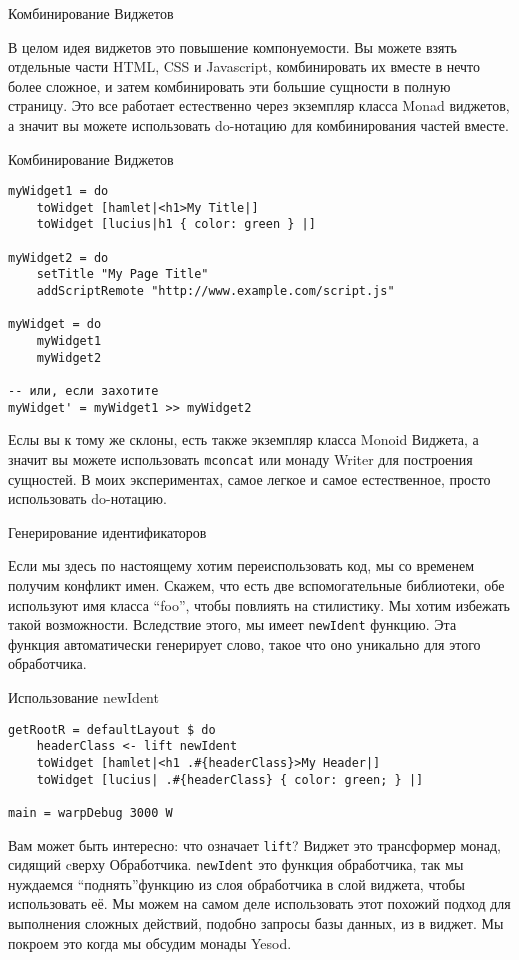 Комбинирование Виджетов

В целом идея виджетов это повышение компонуемости. Вы можете взять  отдельные части HTML, CSS и Javascript, комбинировать их вместе в нечто более сложное, и затем комбинировать эти большие сущности в полную страницу. Это все работает естественно через экземпляр класса Monad виджетов, а значит вы можете использовать do-нотацию для комбинирования частей вместе.

Комбинирование Виджетов

\begin{lstlisting}
myWidget1 = do
    toWidget [hamlet|<h1>My Title|]
    toWidget [lucius|h1 { color: green } |]

myWidget2 = do
    setTitle "My Page Title"
    addScriptRemote "http://www.example.com/script.js"

myWidget = do
    myWidget1
    myWidget2

-- или, если захотите
myWidget' = myWidget1 >> myWidget2
\end{lstlisting}

Еслы вы к тому же склоны, есть также экземпляр класса Monoid Виджета, а значит вы можете использовать \lstinline'mconcat' или монаду Writer для построения сущностей. В моих экспериментах, самое легкое и самое естественное, просто использовать do-нотацию.

Генерирование идентификаторов

Если мы здесь по настоящему хотим переиспользовать код, мы со временем получим конфликт имен. Скажем, что есть две вспомогательные библиотеки, обе используют имя класса \textquotedblleft foo\textquotedblright, чтобы повлиять на стилистику. Мы хотим избежать такой возможности. Вследствие этого, мы имеет \lstinline'newIdent' функцию.  Эта функция автоматически генерирует слово, такое что оно уникально для этого обработчика.

Использование newIdent

\begin{lstlisting}
getRootR = defaultLayout $ do
    headerClass <- lift newIdent
    toWidget [hamlet|<h1 .#{headerClass}>My Header|]
    toWidget [lucius| .#{headerClass} { color: green; } |]

main = warpDebug 3000 W
\end{lstlisting}

Вам может быть интересно: что означает \lstinline'lift'? Виджет это трансформер монад, сидящий cверху Обработчика. \lstinline'newIdent' это функция обработчика, так мы нуждаемся \textquotedblleft поднять\textquotedblright функцию из слоя обработчика в слой виджета, чтобы использовать её. Мы можем на самом деле использовать этот похожий подход для выполнения сложных действий, подобно запросы базы данных, из в виджет. Мы покроем это когда мы обсудим монады Yesod.

